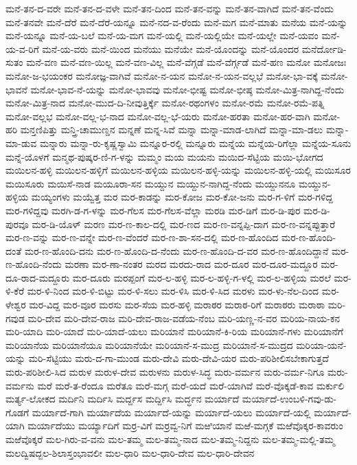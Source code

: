 ಮನೆ-ತನ-ದ-ವರೇ
ಮನೆ-ತನ-ದ-ವಳೇ
ಮನೆ-ತನ-ದಿಂದ
ಮನೆ-ತನ-ವನ್ನು
ಮನೆ-ತನ-ವಾಗಿದೆ
ಮನೆ-ತನ-ವೆಂದು
ಮನೆ-ತನವೇ
ಮನೆ-ದೆರೆ
ಮನೆ-ದೆರೆ-ಯನ್ನೂ
ಮನೆ-ನದ-ವ-ರೆಂದು
ಮನೆ-ಮಗ
ಮನೆ-ಮಾತು
ಮನೆಯ
ಮನೆ-ಯನ್ನು
ಮನೆ-ಯನ್ನೂ
ಮನೆ-ಯ-ಬಲೆ
ಮನೆ-ಯ-ಮಗ
ಮನೆ-ಯಲ್ಲಿ
ಮನೆ-ಯಲ್ಲಿಯೇ
ಮನೆ-ಯಲ್ಲೇ
ಮನೆ-ಯವಂ
ಮನೆ-ಯ-ವ-ರಿಗೆ
ಮನೆ-ಯ-ವರು
ಮನೆ-ಯಿಂದ
ಮನೆಯು
ಮನೆಯೇ
ಮನೆ-ಯೊಂದನ್ನು
ಮನೆ-ಯೊಂದರ
ಮನೆರ್ದೋಡಿ-ಸುತಂ
ಮನೆ-ವಣ
ಮನೆ-ವಣ-ಯಿಲ್ಲ
ಮನೆ-ವಣ-ವಿಲ್ಲ
ಮನೆ-ವೆಗ್ಗಡೆ
ಮನೆ-ವೆರ್ಗ್ಗಡೆ
ಮನೆ-ಹಣ
ಮನೋ
ಮನೋಜಃ
ಮನೋ-ಜ-ಭಯಂಕರ
ಮನೋಜ್ಞ-ವಾಗಿವೆ
ಮನೋ-ನ-ಯನ
ಮನೋ-ನ-ಯನ-ವಲ್ಲಭೆ
ಮನೋ-ಭಾ-ವಕ್ಕೆ
ಮನೋ-ಭಾವನೆ
ಮನೋ-ಭಾವ-ನೆ-ಯನ್ನು
ಮನೋ-ಭಾವವು
ಮನೋ-ಭೀಷ್ಟ
ಮನೋ-ಭೀಷ್ಠ
ಮನೋ-ಮಿತ್ರ-ನಾಗಿದ್ದ-ನೆಂದು
ಮನೋ-ಮಿತ್ರ-ನಾದ
ಮನೋ-ಮುದ-ದಿ-ನೀವುತ್ತಿರ್ಕ್ಕೆ
ಮನೋ-ರಥಂಗಳಂ
ಮನೋ-ರಮೆ
ಮನೋ-ರಮೆ-ಪತ್ನಿ
ಮನೋ-ವಲ್ಲಭ
ಮನೋ-ವಲ್ಲ-ಭ-ನಾದ
ಮನೋ-ವಲ್ಲ-ಭೆ-ಯರು
ಮನೋ-ಹರತಾ
ಮನೋ-ಹರ-ವಾಗಿ
ಮನೋ-ಹರಿ
ಮನ್ತಣಿಪಿತ್ತು
ಮನ್ತ್ರಿ-ಚಾಮುಣ್ಡನ
ಮನ್ನಣೆ
ಮನ್ನ-ಸಿವೆ
ಮನ್ನಾ
ಮನ್ನಾ-ಮಾಡ-ಲಾಗಿದೆ
ಮನ್ನಾ-ಮಾ-ಡಲು
ಮನ್ನಾ-ಮಾ-ಡುವ
ಮನ್ನಾರು
ಮನ್ನಾ-ರು-ಕೃಷ್ಣಸ್ವಾಮಿ
ಮನ್ನೂರ-ರಲ್ಲಿ
ಮನ್ನೂರು
ಮನ್ನೆಯ
ಮನ್ನೆಯ-ರಿಗೆಲ್ಲಾ
ಮನ್ನೆಯ-ಸೂನು
ಮನ್ನೆ-ಯೊಳಗೆ
ಮನ್ಮಥ-ಪುಷ್ಕರ-ಣಿ-ಗ-ಳನ್ನು
ಮಮ್ಮಂ
ಮಯ
ಮಯನು
ಮಯಿದ-ಸೆಟ್ಟಿಯ
ಮಯಿ-ಭೋಗದ
ಮಯಿಲನ-ಹಳ್ಳಿ
ಮಯಿಲನ-ಹಳ್ಳಿಗೆ
ಮಯಿಲನ-ಹಳ್ಳಿಯ
ಮಯಿಲನ-ಹಳ್ಳಿ-ಯನ್ನು
ಮಯಿಲನ-ಹಳ್ಳಿ-ಯಲ್ಲಿ
ಮಯಿಸೂರ
ಮಯಿಸೂರು
ಮಯಿಸೆ-ನಾಡ
ಮಯೂರಾ-ಸನ
ಮಯ್ದುನ
ಮಯ್ದುನ-ನಾಗಿದ್ದ-ನೆಂದು
ಮಯ್ದುನನೂ
ಮಯ್ದುನ-ಹಳ್ಳಿಯ
ಮಯ್ಯಂಗಳು
ಮಯ್ವೆತ್ತ
ಮರ
ಮರ-ಕಾಡನ್ನು
ಮರ-ಕೋಜ
ಮರ-ಕೋ-ಜನು
ಮರ-ಗ-ಳಿಗೆ
ಮರ-ಗಳಿದ್ದ
ಮರ-ಗಳಿದ್ದವು
ಮರಗಿ-ಡ-ಗ-ಳನ್ನು
ಮರ-ಗೆಲಸ
ಮರ-ಗೆಲಸ-ವೆಲ್ಲಾ
ಮರಡಿ
ಮರ-ಡಿಗೆ
ಮರ-ಡಿ-ಪುರ
ಮರ-ಡಿ-ಪುರವೂ
ಮರ-ಡಿ-ಯೊಳ್
ಮರಣ
ಮರ-ಣ-ಕಾಲ-ದಲ್ಲಿ
ಮರ-ಣದ
ಮರ-ಣ-ವನ್ನಪ್ಪಿ-ದಾಗ
ಮರ-ಣ-ವನ್ನಪ್ಪುತ್ತಾರೆ
ಮರ-ಣ-ವನ್ನು
ಮರ-ಣ-ವನ್ನೇ
ಮರ-ಣ-ವೆಂದರೆ
ಮರ-ಣ-ಶಾ-ಸನ-ದಲ್ಲಿ
ಮರ-ಣ-ಹೊಂದಿದ
ಮರ-ಣ-ಹೊಂದಿ-ದಂತೆ
ಮರ-ಣ-ಹೊಂದಿ-ದನು
ಮರ-ಣ-ಹೊಂದಿ-ದ-ನೆಂದು
ಮರ-ಣ-ಹೊಂದಿ-ದ-ವರ
ಮರ-ಣ-ಹೊಂದಿದ್ದಾನೆ
ಮರ-ಣ-ಹೊಂದಿ-ನೆಂದು
ಮರಣಾ
ಮರ-ಣಾ-ನಂತರ
ಮರದ
ಮರದು-ರಾದ
ಮರ-ದೂರ
ಮರ-ದೂರ-ಮದ್ದೂರ
ಮರ-ದೂ-ರಾದ-ಮದ್ದೂರು
ಮರ-ದೂರು
ಮರಪ್ಪಂಗೆ
ಮರ-ಲ-ಹಳ್ಳಿ
ಮರ-ಲ-ಹಳ್ಳಿ-ಗ-ಳಲ್ಲಿ
ಮರ-ಲ-ಹಳ್ಳಿಯ
ಮರಲೆ
ಮರ-ಳಿ-ಕೆರೆ
ಮರ-ಳಿ-ನಿಂದ
ಮರ-ಳಿ-ಬಿಟ್ಟು
ಮರ-ಳಿ-ಸಲು
ಮರ-ಳಿಸಿ
ಮರ-ಳಿ-ಸಿದ
ಮರಳು
ಮರ-ಳು-ನೆಲ-ದಿಂದ
ಮರ-ಳೇಶ್ವರ
ಮರ-ವಿದ್ದ
ಮರ-ವೂರ
ಮರಸು
ಮರ-ಸೆಯ
ಮರ-ಹಳ್ಳಿ
ಮರಾಠರ
ಮರಾಠ-ರಿಗೆ
ಮರಾಠರು
ಮರಾಠಾ
ಮರಿ-ಗವುಡ
ಮರಿ-ದೇವ
ಮರಿ-ದೇವ-ರಾಜ
ಮರಿ-ದೇವ-ರಾಜ-ವಡೆಯ-ನೆಂಬ
ಮರಿ-ಯಣ್ಣ-ನ-ವರ
ಮರಿಯ-ನಾಯ-ಕನ
ಮರಿ-ಯಾದಿ
ಮರಿ-ಯಾದೆ
ಮರಿ-ಯಾದೆ-ಯಲು
ಮರಿಯಾನೆ
ಮರಿಯಾನೆ-ಕಿ-ರಿಯ
ಮರಿಯಾನೆ-ಗಳು
ಮರಿಯಾನೆಗೆ
ಮರಿಯಾನೆಯ
ಮರಿಯಾನೆಯೂ
ಮರಿಯಾನೆಯೇ
ಮರಿಯಾನೆ-ಸ-ಮುದ್ರ
ಮರಿಯಾನೆ-ಸ-ಮುದ್ರದ
ಮರಿಯಾ-ಯನೆ-ಯನ್ನು
ಮರಿ-ಸೆಟ್ಟಿಯು
ಮರು-ದ-ಗಾ-ಮುಂಡ
ಮರು-ದೇವಿ
ಮರು-ದೇವಿ-ಯರ
ಮರು-ಪರಿಶೀಲಿಸಬೇಕಾಗುತ್ತದೆ
ಮರು-ಪರಿಶೀಲಿ-ಸಿದ
ಮರುಳ
ಮರುಳ-ದೇವ
ಮರುಳನು
ಮರುಳ-ಸಿದ್ಧ
ಮರು-ವರ್ಮನ
ಮರು-ವರ್ಮ-ನಿಗೂ
ಮರು-ವರ್ಮನು
ಮರೆ
ಮರೆ-ತ-ರೆಂದೂ
ಮರೆತೂ
ಮರೆ-ಮಗ್ಗ
ಮರೆ-ಯದೆ
ಮರೆ-ಯಾಗಿವೆ
ಮರೆ-ವೊಕ್ಕಡೆ-ಕಾವ
ಮರ್ಕುಲಿ
ಮರ್ತ್ಯ-ಲೋಕದ
ಮರ್ದಿನಿ
ಮರ್ದಿಸಿ
ಮರ್ದ್ದಸ
ಮರ್ದ್ದಿಸಿ
ಮರ್ದ್ಧನ
ಮರ್ಯಾದೆ
ಮರ್ಯಾದೆ-ಉಂಬಳಿ-ಗವು-ಡು-ಗೊಡಗೆ
ಮರ್ಯಾದೆ-ಗಾಗಿ
ಮರ್ಯಾದೆಯ
ಮರ್ಯಾದೆ-ಯನ್ನು
ಮರ್ಯಾದೆ-ಯಲು
ಮರ್ಯಾದೆ-ಯಲ್ಲಿ
ಮರ್ಯಾದೆ-ಯಾಗಿ
ಮರ್ಯಾದೆಯು
ಮರ್ಯ್ಯಾದಿಗೆ
ಮರ್ರ-ವಿಗೆ
ಮರ್ರವ್ವ-ನಿಗೆ
ಮಱಿಯಾನೆ
ಮಱೆ-ಮಗ್ಗಕೆ
ಮಱೆವೊಕ್ಕರ-ಕಾವರುಂ
ಮಱೆವೊಕ್ಕರೆ
ಮಲ-ಗಿರು-ವ-ವನು
ಮಲ-ತಮ್ಮ
ಮಲ-ತಮ್ಮ-ನಾದ
ಮಲ-ತಮ್ಮ-ನಿದ್ದನು
ಮಲ-ತಮ್ಮ-ಮಲ್ಲಿ-ತಮ್ಮ
ಮಲದ್ವಿಷದ್ಬಲ-ಶಿಲಾಸ್ತಂಭಾವಲೀ
ಮಲ-ಧಾರಿ
ಮಲ-ಧಾರಿ-ದೇವ
ಮಲ-ಧಾರಿ-ದೇವನ
